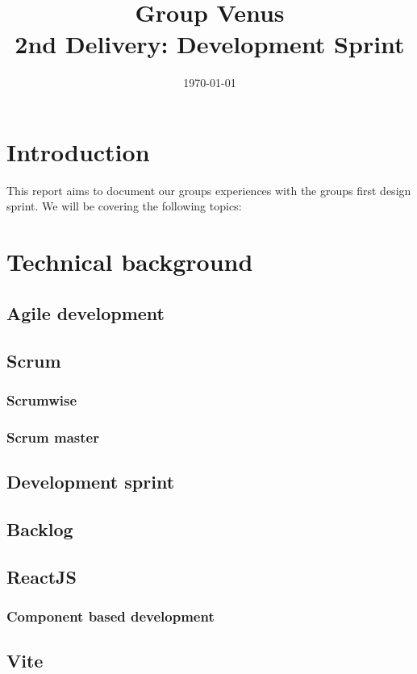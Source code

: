 \documentclass[12pt]{article}
\title{\textbf{Group Venus} \\ 2nd Delivery: Development Sprint}
\date{\today}
\begin{document}
\subsectionfont{\fontsize{12}{14}\selectfont}

\maketitle

\tableofcontents

\pagebreak

\section{Introduction}
This report aims to document our groups experiences with the groups first design sprint.
We will be covering the following topics:

\section{Technical background}
\subsection{Agile development}
\subsection{Scrum}
\subsubsection{Scrumwise}
\subsubsection{Scrum master}
\subsection{Development sprint}
\subsection{Backlog}
\subsection{ReactJS}
\subsubsection{Component based development}
\subsection{Vite}
\end{document}
